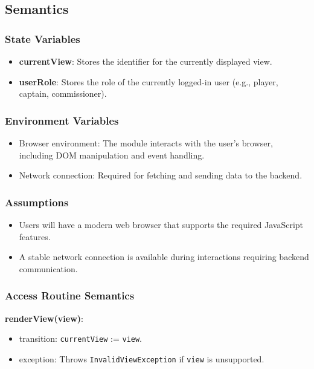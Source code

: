 \documentclass[12pt, titlepage]{article}
\begin{document}
\subsection{Semantics}

\subsubsection{State Variables}

\begin{itemize}
    \item \textbf{currentView}: Stores the identifier for the currently displayed view.
    \item \textbf{userRole}: Stores the role of the currently logged-in user (e.g., player, captain, commissioner).
\end{itemize}

\subsubsection{Environment Variables}

\begin{itemize}
    \item Browser environment: The module interacts with the user's browser, including DOM manipulation and event handling.
    \item Network connection: Required for fetching and sending data to the backend.
\end{itemize}

\subsubsection{Assumptions}

\begin{itemize}
    \item Users will have a modern web browser that supports the required JavaScript features.
    \item A stable network connection is available during interactions requiring backend communication.
\end{itemize}

\subsubsection{Access Routine Semantics}

\noindent \textbf{renderView(view)}:
\begin{itemize}
    \item transition: \texttt{currentView} := \texttt{view}.
    \item exception: Throws \texttt{InvalidViewException} if \texttt{view} is unsupported.
\end{itemize}
\end{document}
